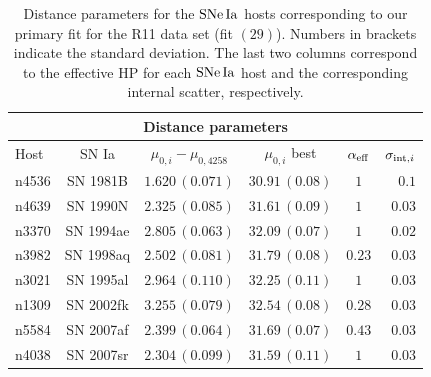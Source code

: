 \begin{table}[tbp]
\centering
\begin{tabular}{@{}lccccr}
\hline
\multicolumn{6}{c}{Distance parameters} \\
\hline
Host & SN Ia & $\mu_{0,i}-\mu_{0,4258}$ & $\mu_{0,i} $ best & $\alpha_{\mathrm{eff}}$ & $\sigma_{\mathrm{int},i}$\\
\hline

 n4536 & SN 1981B & $1.620\,(0.071)$&$30.91\,(0.08)$ &$1$ & $0.1$ \\

 n4639 & SN 1990N & $2.325\,(0.085)$& $31.61\,(0.09)$& $1 $ & $0.03$\\

 n3370 & SN 1994ae & $2.805\,(0.063)$& $32.09\,(0.07)$& $1 $ & $0.02$ \\
 
 n3982 & SN 1998aq & $2.502\,(0.081)$& $31.79\,(0.08)$& $ 0.23$ & $0.03$\\
  
 n3021 & SN 1995al & $2.964\,(0.110)$& $32.25\,(0.11)$& $ 1$ & $0.03$\\
    
 n1309 & SN 2002fk & $3.255\,(0.079)$& $32.54\,(0.08)$& $ 0.28$ & $0.03$\\

 n5584 & SN 2007af & $2.399\,(0.064)$& $31.69\,(0.07)$& $ 0.43$ & $0.03$\\
       
 n4038 & SN 2007sr & $2.304\,(0.099)$& $31.59\,(0.11)$& $ 1$ & $0.03$\\
       
\hline
\end{tabular}
\caption{\label{Table:SNIa-HP-fit-M1a} Distance parameters for the $\mathrm{SNe\,Ia}$ hosts corresponding to our primary fit for the R11 data set (fit $(29)$). Numbers in brackets indicate the standard deviation. The last two columns correspond to the effective HP for each $\mathrm{SNe\,Ia}$ host and the corresponding internal scatter, respectively.}
\end{table}

